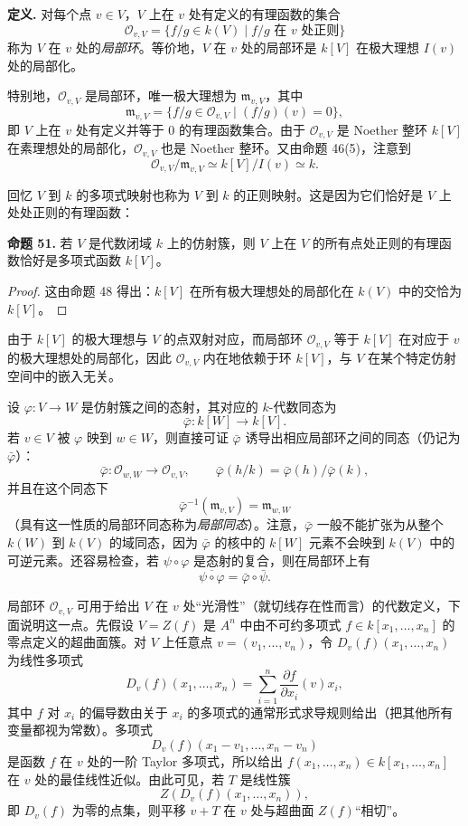 \noindent\textbf{定义.} 对每个点 $v\in V$，$V$ 上在 $v$ 处有定义的有理函数的集合
\[
\mathcal O_{v,V}=\{f/g\in k(V)\mid f/g\text{ 在 }v\text{ 处正则}\}
\]
称为 $V$ 在 $v$ 处的\emph{局部环}。等价地，$V$ 在 $v$ 处的局部环是 $k[V]$ 在极大理想 $I(v)$ 处的局部化。

特别地，$\mathcal O_{v,V}$ 是局部环，唯一极大理想为 $\mathfrak m_{v,V}$，其中
\[
\mathfrak m_{v,V}=\{f/g\in\mathcal O_{v,V}\mid (f/g)(v)=0\},
\]
即 $V$ 上在 $v$ 处有定义并等于 $0$ 的有理函数集合。由于 $\mathcal O_{v,V}$ 是 Noether 整环 $k[V]$ 在素理想处的局部化，$\mathcal O_{v,V}$ 也是 Noether 整环。又由命题 46(5)，注意到
\[
\mathcal O_{v,V}/\mathfrak m_{v,V}\simeq k[V]/I(v)\simeq k.
\]

回忆 $V$ 到 $k$ 的多项式映射也称为 $V$ 到 $k$ 的正则映射。这是因为它们恰好是 $V$ 上处处正则的有理函数：

\noindent\textbf{命题 51.} 若 $V$ 是代数闭域 $k$ 上的仿射簇，则 $V$ 上在 $V$ 的所有点处正则的有理函数恰好是多项式函数 $k[V]$。

\begin{proof}
	这由命题 48 得出：$k[V]$ 在所有极大理想处的局部化在 $k(V)$ 中的交恰为 $k[V]$。
\end{proof}

由于 $k[V]$ 的极大理想与 $V$ 的点双射对应，而局部环 $\mathcal O_{v,V}$ 等于 $k[V]$ 在对应于 $v$ 的极大理想处的局部化，因此 $\mathcal O_{v,V}$ 内在地依赖于环 $k[V]$，与 $V$ 在某个特定仿射空间中的嵌入无关。

设 $\varphi:V\to W$ 是仿射簇之间的态射，其对应的 $k$-代数同态为
\[
\bar\varphi:k[W]\longrightarrow k[V].
\]
若 $v\in V$ 被 $\varphi$ 映到 $w\in W$，则直接可证 $\bar\varphi$ 诱导出相应局部环之间的同态（仍记为 $\bar\varphi$）：
\[
\bar\varphi:\mathcal O_{w,W}\longrightarrow\mathcal O_{v,V},
\qquad
\bar\varphi(h/k)=\bar\varphi(h)/\bar\varphi(k),
\]
并且在这个同态下
\[
\bar\varphi^{-1}(\mathfrak m_{v,V})=\mathfrak m_{w,W}
\]
（具有这一性质的局部环同态称为\emph{局部同态}）。注意，$\bar\varphi$ 一般不能扩张为从整个 $k(W)$ 到 $k(V)$ 的域同态，因为 $\bar\varphi$ 的核中的 $k[W]$ 元素不会映到 $k(V)$ 中的可逆元素。还容易检查，若 $\psi\circ\varphi$ 是态射的复合，则在局部环上有
\[
\overline{\psi\circ\varphi}=\bar\varphi\circ\bar\psi.
\]

局部环 $\mathcal O_{v,V}$ 可用于给出 $V$ 在 $v$ 处“光滑性”（就切线存在性而言）的代数定义，下面说明这一点。先假设 $V=Z(f)$ 是 $A^n$ 中由不可约多项式 $f\in k[x_1,\ldots,x_n]$ 的零点定义的超曲面簇。对 $V$ 上任意点 $v=(v_1,\ldots,v_n)$，令 $D_v(f)(x_1,\ldots,x_n)$ 为线性多项式
\[
D_v(f)(x_1,\ldots,x_n)=\sum_{i=1}^n \frac{\partial f}{\partial x_i}(v)x_i,
\]
其中 $f$ 对 $x_i$ 的偏导数由关于 $x_i$ 的多项式的通常形式求导规则给出（把其他所有变量都视为常数）。多项式
\[
D_v(f)(x_1-v_1,\ldots,x_n-v_n)
\]
是函数 $f$ 在 $v$ 处的一阶 Taylor 多项式，所以给出 $f(x_1,
\ldots,x_n)\in k[x_1,
\ldots,x_n]$ 在 $v$ 处的最佳线性近似。由此可见，若 $T$ 是线性簇
\[
Z(D_v(f)(x_1,
\ldots,x_n)),
\]
即 $D_v(f)$ 为零的点集，则平移 $v+T$ 在 $v$ 处与超曲面 $Z(f)$“相切”。

